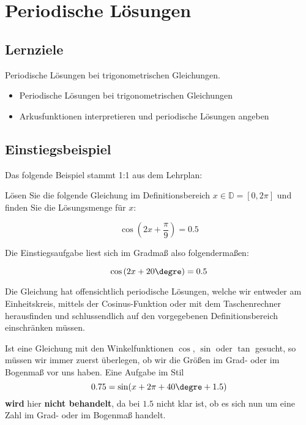 
\section{Periodische Lösungen}

\subsection*{Lernziele}

Periodische Lösungen bei trigonometrischen Gleichungen.

\begin{itemize}
\item Periodische Lösungen bei trigonometrischen Gleichungen
\item Arkusfunktionen interpretieren und periodische Lösungen angeben
\end{itemize}



\subsection{Einstiegsbeispiel}
Das folgende Beispiel stammt 1:1 aus dem Lehrplan:

Lösen Sie die folgende Gleichung im Definitionsbereich $x \in \mathbb{D} = [ 0, 2\pi]$ und finden Sie die Lösungsmenge für $x$:

$$\cos\left(2x+\frac{\pi}{9}\right) = 0.5$$

Die Einstiegsaufgabe liest sich im Gradmaß also folgendermaßen:

$$\cos\left(2x+20\degre\right) = 0.5$$

Die Gleichung hat offensichtlich periodische Lösungen, welche wir entweder am Einheitskreis, mittels der Cosinus-Funktion oder mit dem Taschenrechner herausfinden und schlussendlich auf den vorgegebenen Definitionsbereich einschränken müssen.


\begin{bemerkung}{}{}
  Ist eine Gleichung mit den Winkelfunktionen $\cos$, $\sin$ oder $\tan$ gesucht, so müssen wir immer zuerst überlegen, ob wir die Größen im Grad- oder im Bogenmaß vor uns haben. Eine Aufgabe im Stil $$0.75 = \sin(x + 2\pi + 40\degre + 1.5)$$ \textbf{wird} hier \textbf{nicht behandelt}, da bei $1.5$ nicht klar ist, ob es sich nun um eine Zahl im Grad- oder im Bogenmaß handelt.
\end{bemerkung}%
\newpage


